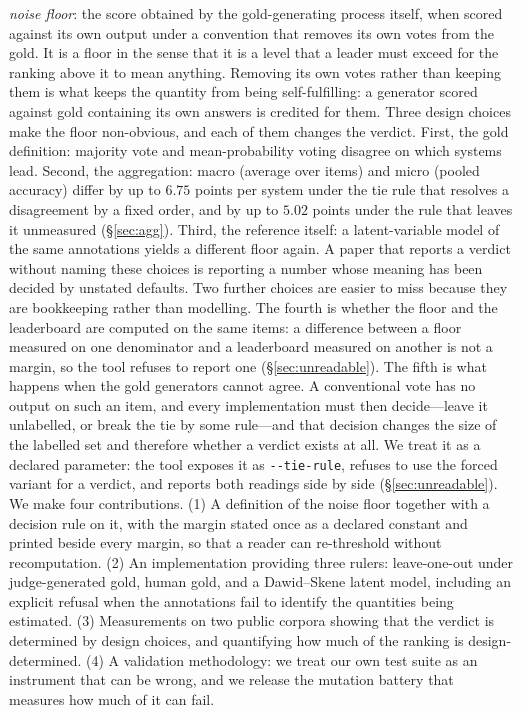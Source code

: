 \documentclass{article}
\begin{document}
\emph{noise floor}: the score obtained by the gold-generating process itself, when scored against its own output under a convention that removes its own votes from the gold. It is a floor in the sense that it is a level that a leader must exceed for the ranking above it to mean anything. Removing its own votes rather than keeping them is what keeps the quantity from being self-fulfilling: a generator scored against gold containing its own answers is credited for them. Three design choices make the floor non-obvious, and each of them changes the verdict. First, the gold definition: majority vote and mean-probability voting disagree on which systems lead. Second, the aggregation: macro (average over items) and micro (pooled accuracy) differ by up to $6.75$ points per system under the tie rule that resolves a disagreement by a fixed order, and by up to $5.02$ points under the rule that leaves it unmeasured (\S\ref{sec:agg}). Third, the reference itself: a latent-variable model of the same annotations yields a different floor again. A paper that reports a verdict without naming these choices is reporting a number whose meaning has been decided by unstated defaults. Two further choices are easier to miss because they are bookkeeping rather than modelling. The fourth is whether the floor and the leaderboard are computed on the same items: a difference between a floor measured on one denominator and a leaderboard measured on another is not a margin, so the tool refuses to report one (\S\ref{sec:unreadable}). The fifth is what happens when the gold generators cannot agree. A conventional vote has no output on such an item, and every implementation must then decide---leave it unlabelled, or break the tie by some rule---and that decision changes the size of the labelled set and therefore whether a verdict exists at all. We treat it as a declared parameter: the tool exposes it as \texttt{-{}-tie-rule}, refuses to use the forced variant for a verdict, and reports both readings side by side (\S\ref{sec:unreadable}). We make four contributions. (1) A definition of the noise floor together with a decision rule on it, with the margin stated once as a declared constant and printed beside every margin, so that a reader can re-threshold without recomputation. (2) An implementation providing three rulers: leave-one-out under judge-generated gold, human gold, and a Dawid--Skene latent model, including an explicit refusal when the annotations fail to identify the quantities being estimated. (3) Measurements on two public corpora showing that the verdict is determined by design choices, and quantifying how much of the ranking is design-determined. (4) A validation methodology: we treat our own test suite as an instrument that can be wrong, and we release the mutation battery that measures how much of it can fail.
\end{document}
